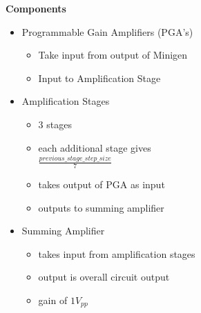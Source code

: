 \documentclass[25pt, a0paper, portrait, margin=0mm, innermargin=15mm, blockverticalspace=15mm, colspace=15mm, subcolspace=8mm]{tikzposter}
\begin{document}
\begin{columns}
{\begin{multicols}{2}
\newpage

\textbf{Components}
\begin{itemize}
\item Programmable Gain Amplifiers (PGA's)
\begin{itemize}
\item Take input from output of Minigen
\item Input to Amplification Stage
\end{itemize}

\item Amplification Stages
\begin{itemize}
\item 3 stages
\item each additional stage gives\\ $\frac{previous\_stage\_step\_size}{7}$
\item takes output of PGA as input
\item outputs to summing amplifier
\end{itemize}

\item Summing Amplifier
\begin{itemize}
\item takes input from amplification stages
\item output is overall circuit output
\item gain of $1V_{pp}$
\end{itemize}

\end{itemize}



\end{multicols}
}

\end{columns}
\end{document}
